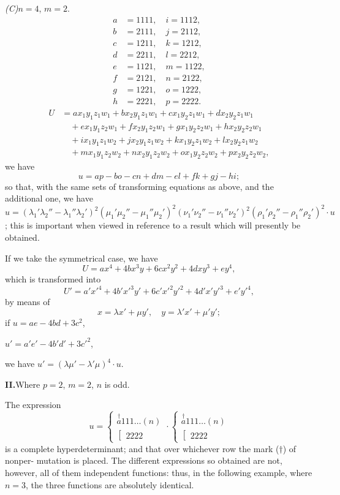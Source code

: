 \documentclass[11pt,a4paper]{article}
\theoremstyle{plain}
\theoremstyle{definition}
\theoremstyle{remark}
\begin{document}
\newpage
\textit{(C)}\quad $n=4$, $m=2$.
\begin{align*}
a &= 1111, \quad i = 1112, \\
b &= 2111, \quad j = 2112, \\
c &= 1211, \quad k = 1212, \\
d &= 2211, \quad l = 2212, \\
e &= 1121, \quad m = 1122, \\
f &= 2121, \quad n = 2122, \\
g &= 1221, \quad o = 1222, \\
h &= 2221, \quad p = 2222.
\end{align*}
\begin{align*}
U &= ax_1y_1z_1w_1 + bx_2y_1z_1w_1 + cx_1y_2z_1w_1 + dx_2y_2z_1w_1 \\
&\quad + ex_1y_1z_2w_1 + fx_2y_1z_2w_1 + gx_1y_2z_2w_1 + hx_2y_2z_2w_1 \\
&\quad + ix_1y_1z_1w_2 + jx_2y_1z_1w_2 + kx_1y_2z_1w_2 + lx_2y_2z_1w_2 \\
&\quad + mx_1y_1z_2w_2 + nx_2y_1z_2w_2 + ox_1y_2z_2w_2 + px_2y_2z_2w_2,
\end{align*}
we have
\[
u = ap - bo - cn + dm - el + fk + gj - hi;
\]
so that, with the same sets of transforming equations as above, and the additional one,
we have $u = (\lambda_1'\lambda_2'' - \lambda_1''\lambda_2')^2 (\mu_1'\mu_2'' - \mu_1''\mu_2')^2 (\nu_1'\nu_2'' - \nu_1''\nu_2')^2 (\rho_1'\rho_2'' - \rho_1''\rho_2')^2 \cdot u$;
this is important when viewed in reference to a result which will presently be obtained.

If we take the symmetrical case, we have
\[
U = ax^4 + 4b x^3y + 6c x^2y^2 + 4d xy^3 + ey^4,
\]
which is transformed into
\[
U' = a'x'^4 + 4b' x'^3y' + 6c' x'^2y'^2 + 4d' x'y'^3 + e'y'^4,
\]
by means of
\[
x = \lambda x' + \mu y', \quad y = \lambda' x' + \mu' y';
\]
if $u = ae - 4bd + 3c^2$,

$u' = a'e' - 4b'd' + 3c'^2$,

we have $u' = (\lambda\mu' - \lambda'\mu)^4 \cdot u$.

\newpage
\textbf{II.}\quad Where $p=2$, $m=2$, $n$ is odd.

The expression
\[
u =
\left\{\begin{array}{c}
\stackrel{\dagger}{a} 111\ldots(n) \\
\left[\begin{array}{c}
2222
\end{array}\right.
\end{array}\right.
\cdot
\left\{\begin{array}{c}
\stackrel{\dagger}{a} 111\ldots(n) \\
\left[\begin{array}{c}
2222
\end{array}\right.
\end{array}\right.
\]
is a complete hyperdeterminant; and that over whichever row the mark ($\dagger$) of nonper-
mutation is placed. The different expressions so obtained are not, however, all of them
independent functions: thus, in the following example, where $n=3$, the three functions
are absolutely identical.
\end{document}
